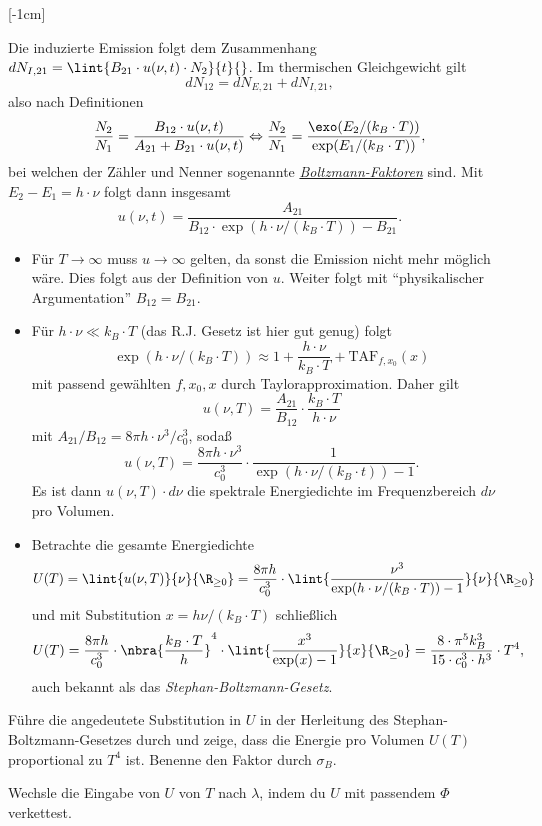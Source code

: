 \documentclass{article}
\begin{document}
    [-1cm]

    Die induzierte Emission folgt dem Zusammenhang $dN_{I,21} = \lint{B_{21}\cdot u(\nu, t)\cdot N_2}{t}{}$. Im thermischen Gleichgewicht gilt
    \[dN_{12} = dN_{E,21} + dN_{I,21},\]
    also nach Definitionen 
    \[\frac{N_2}{N_1} = \frac{B_{12}\cdot u(\nu,t)}{A_{21} + B_{21}\cdot u(\nu,t)} \Leftrightarrow \frac{N_2}{N_1} = \frac{\exo(E_2/(k_B\cdot T))}{\exp(E_1/(k_B\cdot T))},\]
    bei welchen der Zähler und Nenner sogenannte \href{https://de.wikipedia.org/wiki/Boltzmann-Statistik}{\emph{Boltzmann-Faktoren}} sind. Mit $E_2-E_1 = h\cdot\nu$ folgt dann insgesamt 
    \[u(\nu,t) = \frac{A_{21}}{B_{12}\cdot\exp(h\cdot\nu/(k_B\cdot T)) - B_{21}}.\]

    \begin{itemize}
        \item Für $T\to\infty$ muss $u\to\infty$ gelten, da sonst die Emission nicht mehr möglich wäre. Dies folgt aus der Definition von $u$. Weiter folgt mit \enquote{physikalischer Argumentation} $B_{12} = B_{21}$.
        \item Für $h\cdot\nu \ll k_B\cdot T$ (das R.J. Gesetz ist hier gut genug) folgt 
        \[\exp(h\cdot\nu / (k_B\cdot T))\approx 1+\frac{h\cdot\nu}{k_B\cdot T}+\text{TAF}_{f,x_0}(x)\]
        mit passend gewählten $f,x_0,x$ durch Taylorapproximation. Daher gilt
        \[u(\nu,T) = \frac{A_{21}}{B_{12}}\cdot\frac{k_B\cdot T}{h\cdot\nu}\]
        mit $A_{21}/B_{12} = 8\pi h\cdot\nu^3/c_0^3$, sodaß 
        \[u(\nu,T) = \frac{8\pi h\cdot\nu^3}{c_0^3} \cdot\frac{1}{\exp(h\cdot\nu /(k_B\cdot t)) - 1}.\]
        Es ist dann $u(\nu,T) \cdot d\nu$ die spektrale Energiedichte im Frequenzbereich $d\nu$ pro Volumen. 
        \item Betrachte die gesamte Energiedichte 
        \[U(T) = \lint{u(\nu,T)}{\nu}{\R_{\geq 0}} = \frac{8\pi h}{c_0^3}\cdot\lint{\frac{\nu^3}{\exp(h\cdot\nu/(k_B\cdot T)) - 1}}{\nu}{\R_{\geq 0}}\]
        und mit Substitution $x = h\nu / (k_B\cdot T)$ schließlich 
        \[U(T) = \frac{8\pi h}{c_0^3} \cdot\nbra{\frac{k_B\cdot T}{h}}^4\cdot\lint{\frac{x^3}{\exp(x)-1}}{x}{\R_{\geq 0}} = \frac{8\cdot\pi^5 k_B^3}{15\cdot c_0^3\cdot h^3}\cdot T^4,\]
        auch bekannt als das \emph{Stephan-Boltzmann-Gesetz}.
    \end{itemize}
    \begin{Aufgabe}
        \nr{} Führe die angedeutete Substitution in $U$ in der Herleitung des Stephan-Boltzmann-Gesetzes durch und zeige, dass die Energie pro Volumen $U(T)$ proportional zu $T^4$ ist. Benenne den Faktor durch $\sigma_B$. 
        
        \nr{} Wechsle die Eingabe von $U$ von $T$ nach $\lambda$, indem du $U$ mit passendem $\Phi$ verkettest.
    \end{Aufgabe}
\end{document}

